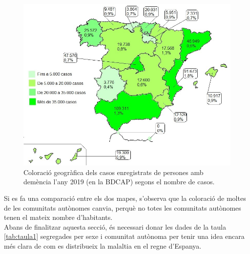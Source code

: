 \documentclass[a4paper,12pt]{report}
\begin{document}
\begin{figure}[H]
    \centering
    \includegraphics[scale = 0.6]{images/distribucio territorial en base a casos.jpg}
    \caption{Coloració geogràfica dels casos enregistrats de persones amb demència l'any 2019 (en la BDCAP) segons el nombre de casos.}
    \label{fig:colorcasos}
\end{figure}
Si es fa una comparació entre els dos mapes, s'observa que la coloració de moltes de les comunitats autònomes canvia, perquè no totes les comunitats autònomes tenen el mateix nombre d'habitants.\\
Abans de finalitzar aquesta secció, és necessari donar les dades de la taula \ref{tab:taula1} segregades per sexe i comunitat autònoma per tenir una idea encara més clara de com es distribueix la malaltia en el regne d'Espanya.
\end{document}
